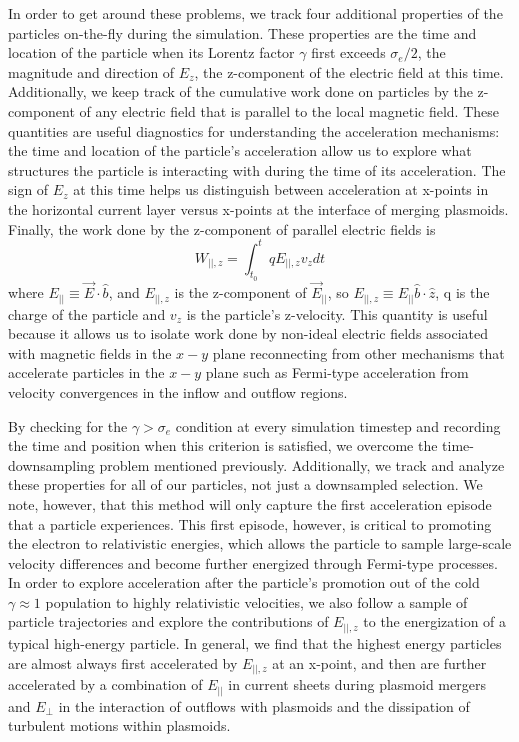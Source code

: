 \documentclass[iop,twocolappendix]{emulateapj}
\begin{document}
In order to get around these problems, we track four additional properties of the particles on-the-fly during the simulation.  These properties are the time and location of the particle when its Lorentz factor $\gamma$ first exceeds $\sigma_{e}/2$, the magnitude and direction of $E_{z}$, the z-component of the electric field at this time.  Additionally, we keep track of the cumulative work done on particles by the z-component of any electric field that is parallel to the local magnetic field.  These quantities are useful diagnostics for understanding the acceleration mechanisms: the time and location of the particle's acceleration allow us to explore what structures the particle is interacting with during the time of its acceleration.  The sign of $E_{z}$ at this time helps us distinguish between acceleration at x-points in the horizontal current layer versus x-points at the interface of merging plasmoids.  Finally, the work done by the z-component of parallel electric fields is
\begin{equation}
	W_{||,z} = \int_{t_{0}}^{t}q E_{||,z}v_{z}dt
\end{equation}
where $E_{||}\equiv\vec{E}\cdot \hat{b}$, and $E_{||,z}$ is the z-component of $\vec{E}_{||}$, so $E_{||,z}\equiv E_{||}\hat{b}\cdot \hat{z}$, q is the charge of the particle and $v_{z}$ is the particle's z-velocity.  This quantity is useful because it allows us to isolate work done by non-ideal electric fields associated with magnetic fields in the $x-y$ plane reconnecting from other mechanisms that accelerate particles in the $x-y$ plane such as Fermi-type acceleration from velocity convergences in the inflow and outflow regions.

By checking for the $\gamma > \sigma_{e}$ condition at every simulation timestep and recording the time and position when this criterion is satisfied, we overcome the time-downsampling problem mentioned previously.  Additionally, we track and analyze these properties for all of our particles, not just a downsampled selection.  We note, however, that this method will only capture the first acceleration episode that a particle experiences.  This first episode, however, is critical to promoting the electron to relativistic energies, which allows the particle to sample large-scale velocity differences and become further energized through Fermi-type processes.  In order to explore acceleration after the particle's promotion out of the cold $\gamma\approx1$ population to highly relativistic velocities, we also follow a sample of particle trajectories and explore the contributions of $E_{||,z}$ to the energization of a typical high-energy particle.  In general, we find that the highest energy particles are almost always first accelerated by $E_{||,z}$ at an x-point, and then are further accelerated by a combination of $E_{||}$ in current sheets during plasmoid mergers and $E_{\bot}$ in the interaction of outflows with plasmoids and the dissipation of turbulent motions within plasmoids.
\end{document}
